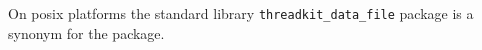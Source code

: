 
On posix platforms the standard library {\tt threadkit\_data\_file} package is a synonym for 
the  package.

